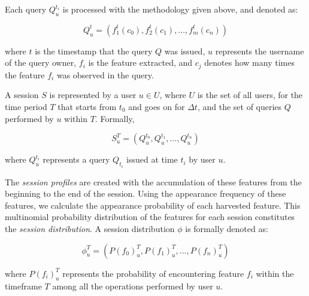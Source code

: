 


 Each query $Q^{t_i}_u$ is processed with the methodology given above, and denoted as:

\begin{equation}
Q^{t}_u = ( f^{t}_1(c_0), f_2^{t}(c_1), ... , f_m^{t}(c_n) )
\end{equation}

where $t$ is the timestamp that the query $Q$ was issued, $u$ represents the username of the query owner, $f_i$ is the feature extracted, and $c_j$ denotes how many times the feature $f_i$ was observed in the query.


A session $S$ is represented by a user $u \in U$, where $U$ is the set of all users, for the time period $T$ that starts from $t_0$ and goes on for $\Delta t$, and the set of queries $Q$ performed by $u$ within $T$. Formally,

\begin{equation}
S^T_u = ( Q^{t_0}_u, Q^{t_1}_u, ... , Q^{t_n}_u )
\end{equation}

where $Q^{t_i}_u$ represents a query $Q_{t_i}$ issued at time $t_i$ by user $u$.

The \textit{session profiles} are created with the accumulation of these features from the beginning to the end of the session.
Using the appearance frequency of these features, we calculate the appearance probability of each harvested feature.
This multinomial probability distribution of the features for each session constitutes the \textit{session distribution}.
A session distribution $\phi$ is formally denoted as:

\begin{equation}
\phi^T_u = ( P(f_0)^{T}_u, P(f_1)^{T}_u, ... , P(f_n)^{T}_u )
\end{equation}

where $P(f_i)^{T}_u$ represents the probability of encountering feature $f_i$ within the timeframe $T$ among all the operations performed by user $u$.



